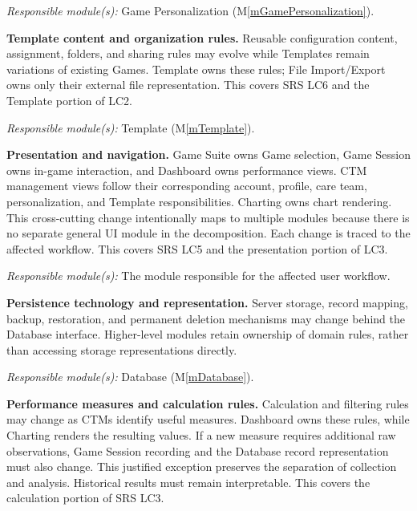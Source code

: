 \documentclass[12pt, titlepage]{article}
\newcounter{acnum}
\newcommand{\actheacnum}{AC\theacnum}
\newcommand{\mref}[1]{M\ref{#1}}
\begin{document}
\begin{description}
\textit{Responsible module(s):} Game Personalization
(\mref{mGamePersonalization}).

\item[\refstepcounter{acnum} \actheacnum
\label{acTemplateOrganization}:]
\textbf{Template content and organization rules.}
Reusable configuration content, assignment, folders, and sharing rules may evolve while Templates remain variations of existing Games. Template owns these rules; File Import/Export owns only their external file representation. This covers SRS LC6 and the Template portion of LC2.

\textit{Responsible module(s):} Template (\mref{mTemplate}).

\item[\refstepcounter{acnum} \actheacnum
\label{acUserInterface}:]
\textbf{Presentation and navigation.}
Game Suite owns Game selection, Game Session owns in-game interaction, and Dashboard owns performance views. CTM management views follow their corresponding account, profile, care team, personalization, and Template responsibilities. Charting owns chart rendering. This cross-cutting change intentionally maps to multiple modules because there is no separate general UI module in the decomposition. Each change is traced to the affected workflow. This covers SRS LC5 and the presentation portion of LC3.

\textit{Responsible module(s):} The module responsible for the affected
user workflow.

\item[\refstepcounter{acnum} \actheacnum
\label{acDataStorage}:]
\textbf{Persistence technology and representation.}
Server storage, record mapping, backup, restoration, and permanent deletion mechanisms may change behind the Database interface. Higher-level modules retain ownership of domain rules, rather than accessing storage representations directly.

\textit{Responsible module(s):} Database (\mref{mDatabase}).

\item[\refstepcounter{acnum} \actheacnum
\label{acPerformanceReporting}:]
\textbf{Performance measures and calculation rules.}
Calculation and filtering rules may change as CTMs identify useful measures. Dashboard owns these rules, while Charting renders the resulting values. If a new measure requires additional raw observations, Game Session recording and the Database record representation must also change. This justified exception preserves the separation of collection and analysis. Historical results must remain interpretable. This covers the calculation portion of SRS LC3.


\end{description}
\end{document}
